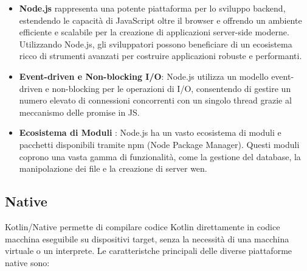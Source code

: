 \documentclass[12pt,a4paper,openright,twoside]{book}
\begin{document}
\begin{itemize}
\item \textbf{Node.js} rappresenta una potente piattaforma per lo sviluppo backend, estendendo le capacità di JavaScript oltre il browser e offrendo un ambiente efficiente e scalabile 
per la creazione di applicazioni server-side moderne. Utilizzando Node.js, gli sviluppatori possono beneficiare di un ecosistema ricco di strumenti avanzati per costruire
applicazioni robuste e performanti.
\item \textbf{Event-driven e Non-blocking I/O}: Node.js utilizza un modello event-driven e non-blocking per le operazioni di I/O, consentendo di gestire un numero elevato di connessioni
 concorrenti con un singolo thread grazie al meccanismo delle promise in \ac{JS}.
\item \textbf{Ecosistema di Moduli }: Node.js ha un vasto ecosistema di moduli e pacchetti disponibili tramite npm (Node Package Manager). 
Questi moduli coprono una vasta gamma di funzionalità, come la gestione del database, la manipolazione dei file e la creazione di server wen. 
\end{itemize}

\subsection{Native}

Kotlin/Native permette di compilare codice Kotlin direttamente in codice macchina eseguibile su dispositivi target, senza la necessità di una macchina virtuale o un interprete.
Le caratteristche principali delle diverse piattaforme native sono:
\end{document}
